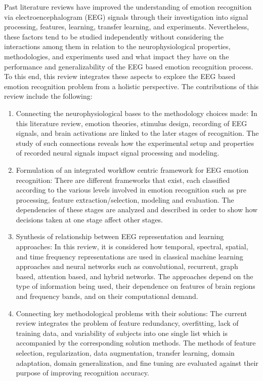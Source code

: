 \documentclass[ASNA,twocolumn]{USG}
\begin{document}
Past literature reviews have improved the understanding of emotion recognition via electroencephalogram (EEG) signals through their investigation into signal processing, features, learning, transfer learning, and experiments. Nevertheless, these factors tend to be studied independently without considering the interactions among them in relation to the neurophysiological properties, methodologies, and experiments used and what impact they have on the performance and generalizability of the EEG based emotion recognition process. To this end, this review integrates these aspects to explore the EEG based emotion recognition problem from a holistic perspective. The contributions of this review include the following:

\begin{enumerate}

  \item Connecting the neurophysiological bases to the methodology choices made: In this literature review, emotion theories, stimulus design, recording of EEG signals, and brain activations are linked to the later stages of recognition. The study of such connections reveals how the experimental setup and properties of recorded neural signals impact signal processing and modeling.

  \item Formulation of an integrated workflow centric framework for EEG emotion recognition: There are different frameworks that exist, each classified according to the various levels involved in emotion recognition such as pre processing, feature extraction/selection, modeling and evaluation. The dependencies of these stages are analyzed and described in order to show how decisions taken at one stage affect other stages.

  \item Synthesis of relationship between EEG representation and learning approaches: In this review, it is considered how temporal, spectral, spatial, and time frequency representations are used in classical machine learning approaches and neural networks such as convolutional, recurrent, graph based, attention based, and hybrid networks. The approaches depend on the type of information being used, their dependence on features of brain regions and frequency bands, and on their computational demand.

  \item Connecting key methodological problems with their solutions: The current review integrates the problem of feature redundancy, overfitting, lack of training data, and variability of subjects into one single list which is accompanied by the corresponding solution methods. The methods of feature selection, regularization, data augmentation, transfer learning, domain adaptation, domain generalization, and fine tuning are evaluated against their purpose of improving recognition accuracy.


\end{enumerate}
\end{document}
